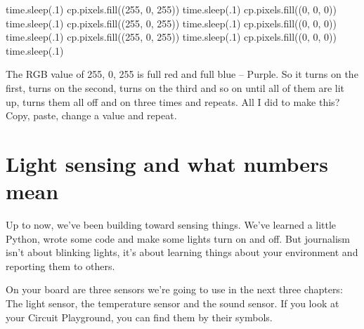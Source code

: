 \documentclass[
]{book}
\newenvironment{Shaded}{\begin{snugshade}}{\end{snugshade}}
\newcommand{\DecValTok}[1]{\textcolor[rgb]{0.00,0.00,0.81}{#1}}
\newcommand{\NormalTok}[1]{#1}
\begin{document}
\begin{Shaded}
\begin{Highlighting}[]
\NormalTok{    time.sleep(.}\DecValTok{1}\NormalTok{)}
\NormalTok{    cp.pixels.fill((}\DecValTok{255}\NormalTok{, }\DecValTok{0}\NormalTok{, }\DecValTok{255}\NormalTok{))}
\NormalTok{    time.sleep(.}\DecValTok{1}\NormalTok{)}
\NormalTok{    cp.pixels.fill((}\DecValTok{0}\NormalTok{, }\DecValTok{0}\NormalTok{, }\DecValTok{0}\NormalTok{))}
\NormalTok{    time.sleep(.}\DecValTok{1}\NormalTok{)}
\NormalTok{    cp.pixels.fill((}\DecValTok{255}\NormalTok{, }\DecValTok{0}\NormalTok{, }\DecValTok{255}\NormalTok{))}
\NormalTok{    time.sleep(.}\DecValTok{1}\NormalTok{)}
\NormalTok{    cp.pixels.fill((}\DecValTok{0}\NormalTok{, }\DecValTok{0}\NormalTok{, }\DecValTok{0}\NormalTok{))}
\NormalTok{    time.sleep(.}\DecValTok{1}\NormalTok{)}
\NormalTok{    cp.pixels.fill((}\DecValTok{255}\NormalTok{, }\DecValTok{0}\NormalTok{, }\DecValTok{255}\NormalTok{))}
\NormalTok{    time.sleep(.}\DecValTok{1}\NormalTok{)}
\NormalTok{    cp.pixels.fill((}\DecValTok{0}\NormalTok{, }\DecValTok{0}\NormalTok{, }\DecValTok{0}\NormalTok{))}
\NormalTok{    time.sleep(.}\DecValTok{1}\NormalTok{)}
\end{Highlighting}
\end{Shaded}

The RGB value of 255, 0, 255 is full red and full blue -- Purple. So it turns on the first, turns on the second, turns on the third and so on until all of them are lit up, turns them all off and on three times and repeats. All I did to make this? Copy, paste, change a value and repeat.

\hypertarget{light-sensing-and-what-numbers-mean}{%
\chapter{Light sensing and what numbers mean}\label{light-sensing-and-what-numbers-mean}}

Up to now, we've been building toward sensing things. We've learned a little Python, wrote some code and make some lights turn on and off. But journalism isn't about blinking lights, it's about learning things about your environment and reporting them to others.

On your board are three sensors we're going to use in the next three chapters: The light sensor, the temperature sensor and the sound sensor. If you look at your Circuit Playground, you can find them by their symbols.
\end{document}
